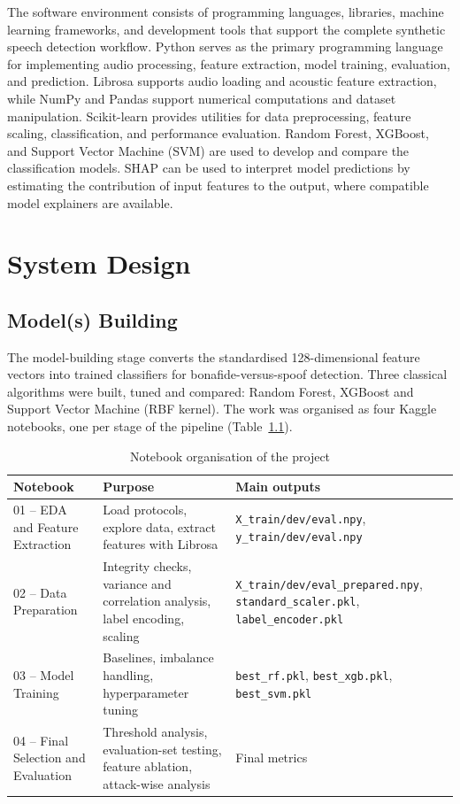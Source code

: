 \documentclass[12pt,a4paper]{report}
\begin{document}
The software environment consists of programming languages, libraries, machine learning frameworks, and development tools that support the complete synthetic speech detection workflow. Python serves as the primary programming language for implementing audio processing, feature extraction, model training, evaluation, and prediction. Librosa supports audio loading and acoustic feature extraction, while NumPy and Pandas support numerical computations and dataset manipulation. Scikit-learn provides utilities for data preprocessing, feature scaling, classification, and performance evaluation. Random Forest, XGBoost, and Support Vector Machine (SVM) are used to develop and compare the classification models. SHAP can be used to interpret model predictions by estimating the contribution of input features to the output, where compatible model explainers are available.





\chapter{System Design}
 
\section{Model(s) Building}
The model-building stage converts the standardised 128-dimensional feature vectors into trained classifiers for bonafide-versus-spoof detection. Three classical algorithms were built, tuned and compared: Random Forest, XGBoost and Support Vector Machine (RBF kernel). The work was organised as four Kaggle notebooks, one per stage of the pipeline (Table~\ref{tab:notebooks}).
 
\begin{table}[H]
\centering
\small
\begin{tabular}{p{4.2cm}p{5.6cm}p{4.6cm}}
\toprule
\textbf{Notebook} & \textbf{Purpose} & \textbf{Main outputs}\\
\midrule
01 -- EDA and Feature Extraction & Load protocols, explore data, extract features with Librosa & \texttt{X\_train/dev/eval.npy}, \texttt{y\_train/dev/eval.npy}\\
02 -- Data Preparation & Integrity checks, variance and correlation analysis, label encoding, scaling & \texttt{X\_train/dev/eval\_prepared.npy}, \texttt{standard\_scaler.pkl}, \texttt{label\_encoder.pkl}\\
03 -- Model Training & Baselines, imbalance handling, hyperparameter tuning & \texttt{best\_rf.pkl}, \texttt{best\_xgb.pkl}, \texttt{best\_svm.pkl}\\
04 -- Final Selection and Evaluation & Threshold analysis, evaluation-set testing, feature ablation, attack-wise analysis & Final metrics\\
\bottomrule
\end{tabular}
\caption{Notebook organisation of the project}
\label{tab:notebooks}
\end{table}
 
\end{document}
